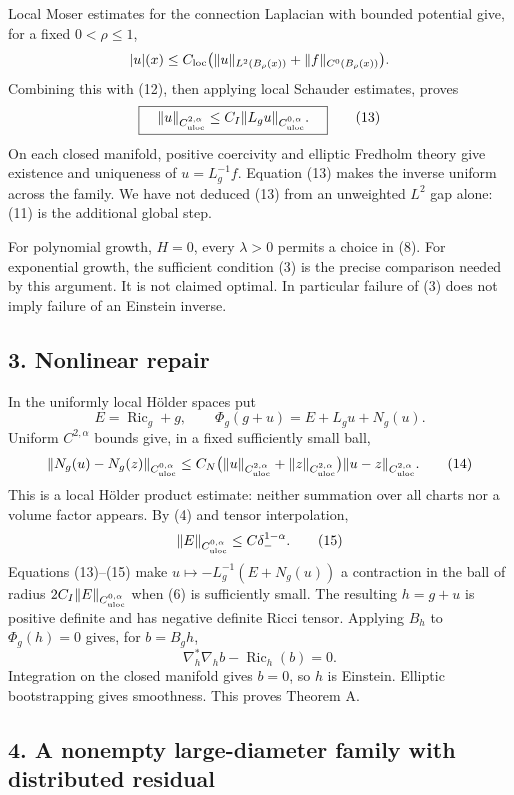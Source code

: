 \documentclass[
  11pt,
]{article}
\begin{document}
Local Moser estimates for the connection Laplacian with bounded
potential give, for a fixed \(0<\rho\le1\), \[
 |u|(x)\le C_{\rm loc}
       \bigl(\|u\|_{L^2(B_\rho(x))}+\|f\|_{C^0(B_\rho(x))}\bigr).
\] Combining this with (12), then applying local Schauder estimates,
proves \[
 \boxed{\quad
 \|u\|_{C^{2,\alpha}_{\rm uloc}}
     \le C_I\|L_gu\|_{C^{0,\alpha}_{\rm uloc}}.
 \quad}                                                     \tag{13}
\] On each closed manifold, positive coercivity and elliptic Fredholm
theory give existence and uniqueness of \(u=L_g^{-1}f\). Equation (13)
makes the inverse uniform across the family. We have not deduced (13)
from an unweighted \(L^2\) gap alone: (11) is the additional global
step.

For polynomial growth, \(H=0\), every \(\lambda>0\) permits a choice in
(8). For exponential growth, the sufficient condition (3) is the precise
comparison needed by this argument. It is not claimed optimal. In
particular failure of (3) does not imply failure of an Einstein inverse.

\hypertarget{nonlinear-repair}{%
\subsection{3. Nonlinear repair}\label{nonlinear-repair}}

In the uniformly local Hölder spaces put \[
 E=\operatorname{Ric}_g+g,\qquad
 \Phi_g(g+u)=E+L_gu+N_g(u).
\] Uniform \(C^{2,\alpha}\) bounds give, in a fixed sufficiently small
ball, \[
 \|N_g(u)-N_g(z)\|_{C^{0,\alpha}_{\rm uloc}}
 \le C_N\bigl(\|u\|_{C^{2,\alpha}_{\rm uloc}}
             +\|z\|_{C^{2,\alpha}_{\rm uloc}}\bigr)
                \|u-z\|_{C^{2,\alpha}_{\rm uloc}}.             \tag{14}
\] This is a local Hölder product estimate: neither summation over all
charts nor a volume factor appears. By (4) and tensor interpolation, \[
 \|E\|_{C^{0,\alpha}_{\rm uloc}}\le C\delta_-^{1-\alpha}.       \tag{15}
\] Equations (13)--(15) make \(u\mapsto-L_g^{-1}(E+N_g(u))\) a
contraction in the ball of radius
\(2C_I\|E\|_{C^{0,\alpha}_{\rm uloc}}\) when (6) is sufficiently small.
The resulting \(h=g+u\) is positive definite and has negative definite
Ricci tensor. Applying \(B_h\) to \(\Phi_g(h)=0\) gives, for \(b=B_gh\),
\[
              \nabla_h^*\nabla_h b-\operatorname{Ric}_h(b)=0.
\] Integration on the closed manifold gives \(b=0\), so \(h\) is
Einstein. Elliptic bootstrapping gives smoothness. This proves Theorem
A.

\hypertarget{a-nonempty-large-diameter-family-with-distributed-residual}{%
\subsection{4. A nonempty large-diameter family with distributed
residual}\label{a-nonempty-large-diameter-family-with-distributed-residual}}
\end{document}
